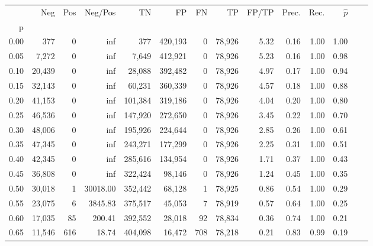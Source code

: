 \begin{tabular}{rrrrrrrrrrrrrr}
\toprule
{} &     Neg &     Pos &   Neg/Pos &       TN &       FP &      FN &      TP & FP/TP & Prec. &  Rec. & $\hat{p}$ \\
p    &         &         &           &          &          &         &         &       &       &       &           \\
\midrule
0.00 &     377 &       0 &       inf &      377 &  420,193 &       0 &  78,926 &  5.32 &  0.16 &  1.00 &      1.00 \\
0.05 &   7,272 &       0 &       inf &    7,649 &  412,921 &       0 &  78,926 &  5.23 &  0.16 &  1.00 &      0.98 \\
0.10 &  20,439 &       0 &       inf &   28,088 &  392,482 &       0 &  78,926 &  4.97 &  0.17 &  1.00 &      0.94 \\
0.15 &  32,143 &       0 &       inf &   60,231 &  360,339 &       0 &  78,926 &  4.57 &  0.18 &  1.00 &      0.88 \\
0.20 &  41,153 &       0 &       inf &  101,384 &  319,186 &       0 &  78,926 &  4.04 &  0.20 &  1.00 &      0.80 \\
0.25 &  46,536 &       0 &       inf &  147,920 &  272,650 &       0 &  78,926 &  3.45 &  0.22 &  1.00 &      0.70 \\
0.30 &  48,006 &       0 &       inf &  195,926 &  224,644 &       0 &  78,926 &  2.85 &  0.26 &  1.00 &      0.61 \\
0.35 &  47,345 &       0 &       inf &  243,271 &  177,299 &       0 &  78,926 &  2.25 &  0.31 &  1.00 &      0.51 \\
0.40 &  42,345 &       0 &       inf &  285,616 &  134,954 &       0 &  78,926 &  1.71 &  0.37 &  1.00 &      0.43 \\
0.45 &  36,808 &       0 &       inf &  322,424 &   98,146 &       0 &  78,926 &  1.24 &  0.45 &  1.00 &      0.35 \\
0.50 &  30,018 &       1 &  30018.00 &  352,442 &   68,128 &       1 &  78,925 &  0.86 &  0.54 &  1.00 &      0.29 \\
0.55 &  23,075 &       6 &   3845.83 &  375,517 &   45,053 &       7 &  78,919 &  0.57 &  0.64 &  1.00 &      0.25 \\
0.60 &  17,035 &      85 &    200.41 &  392,552 &   28,018 &      92 &  78,834 &  0.36 &  0.74 &  1.00 &      0.21 \\
0.65 &  11,546 &     616 &     18.74 &  404,098 &   16,472 &     708 &  78,218 &  0.21 &  0.83 &  0.99 &      0.19 \\

\end{tabular}
